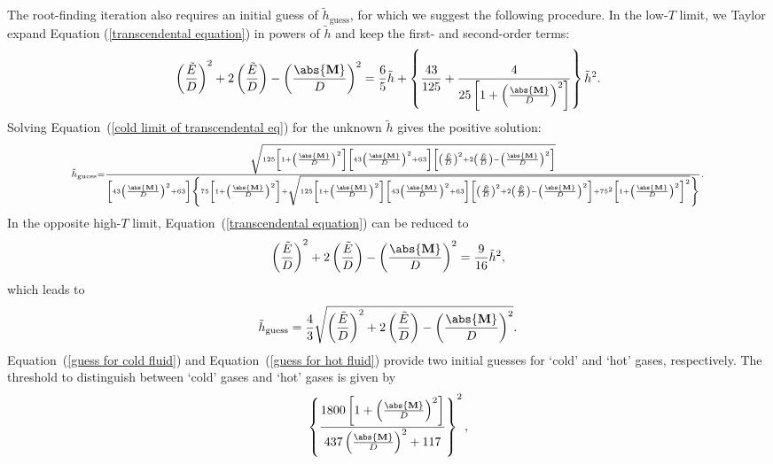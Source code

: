 The root-finding iteration also requires an initial guess of $\tilde{h}_{\text{guess}}$, for which we suggest the following procedure. In the low-$T$ limit, we Taylor expand Equation (\ref{transcendental equation}) in powers of $\tilde{h}$ and keep the first- and second-order terms:
\begin{equation}
\left(\frac{\tilde{E}}{D}\right)^2+2\left(\frac{\tilde{E}}{D}\right)-\left(\frac{\abs{\mathbf{M}}}{D}\right)^2
=\frac{6}{5}\tilde{h}+\left\{\frac{43}{125}+\frac{4}{25\left[1+\left(\frac{\abs{\mathbf{M}}}{D}\right)^2\right]}\right\}\tilde{h}^2.
\label{cold limit of transcendental eq}
\end{equation}
Solving Equation~(\ref{cold limit of transcendental eq}) for the unknown $\tilde{h}$ gives the positive solution:
\begin{equation}
{\scriptstyle
\tilde{h}_{\text{guess}}
=\frac{
\sqrt{125\left[1+\left(\frac{\abs{\mathbf{M}}}{D}\right)^2\right]\left[43\left(\frac{\abs{\mathbf{M}}}{D}\right)^2+63\right]\left[\left(\frac{\tilde{E}}{D}\right)^2+2\left(\frac{\tilde{E}}{D}\right)-\left(\frac{\abs{\mathbf{M}}}{D}\right)^2\right]}}
{\left[43\left(\frac{\abs{\mathbf{M}}}{D}\right)^2+63\right]\left\{75\left[1+\left(\frac{\abs{\mathbf{M}}}{D}\right)^2\right]+\sqrt{125\left[1+\left(\frac{\abs{\mathbf{M}}}{D}\right)^2\right]\left[43\left(\frac{\abs{\mathbf{M}}}{D}\right)^2+63\right]\left[\left(\frac{\tilde{E}}{D}\right)^2+2\left(\frac{\tilde{E}}{D}\right)-\left(\frac{\abs{\mathbf{M}}}{D}\right)^2\right]+75^2\left[1+\left(\frac{\abs{\mathbf{M}}}{D}\right)^2\right]^2}\right\}}.
}
\label{guess for cold fluid}
\end{equation} In the opposite high-$T$ limit, Equation~(\ref{transcendental equation}) can be reduced to
\begin{equation}
\left(\frac{\tilde{E}}{D}\right)^2+2\left(\frac{\tilde{E}}{D}\right)-\left(\frac{\abs{\mathbf{M}}}{D}\right)^2
=\frac{9}{16}\tilde{h}^2,
\label{hot limit of transcendental eq}
\end{equation}
which leads to
\begin{equation}
\tilde{h}_{\text{guess}}=
\frac{4}{3}\sqrt{\left(\frac{\tilde{E}}{D}\right)^2+2\left(\frac{\tilde{E}}{D}\right)-\left(\frac{\abs{\mathbf{M}}}{D}\right)^2}.
\label{guess for hot fluid}
\end{equation}
Equation~(\ref{guess for cold fluid}) and Equation~(\ref{guess for hot fluid}) provide two initial guesses for `cold' and `hot' gases, respectively. The threshold to distinguish between `cold' gases and `hot' gases is given by
\begin{equation}
\left\{\frac{1800\left[1+\left(\frac{\abs{\mathbf{M}}}{D}\right)^2\right]}{437\left(\frac{\abs{\mathbf{M}}}{D}\right)^2+117}\right\}^2,
\label{ColdHot}
\end{equation}
